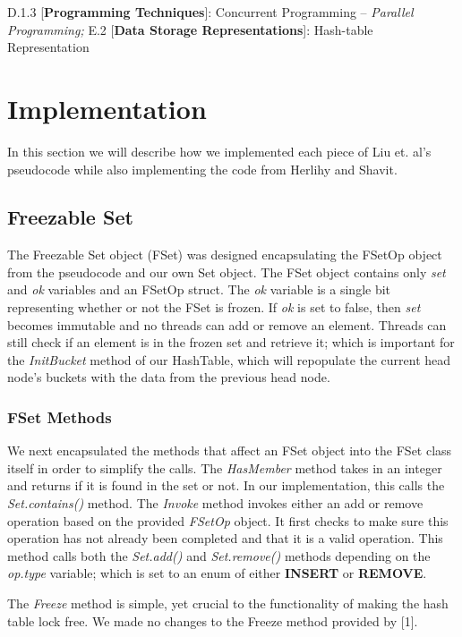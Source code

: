 \documentclass[11pt]{article} %
\begin{document}
D.1.3 [\textbf{Programming Techniques}]: Concurrent Programming -- \textit{Parallel Programming;} E.2 [\textbf{Data Storage Representations}]: Hash-table Representation

\section{Implementation}

In this section we will describe how we implemented each piece of Liu et. al's pseudocode while also implementing the code from Herlihy and Shavit.

\subsection{Freezable Set}

The Freezable Set object (FSet) was designed encapsulating the FSetOp object from the pseudocode and our own Set object. The FSet object contains only \textit{set} and \textit{ok} variables and an FSetOp struct. The \textit{ok} variable is a single bit representing whether or not the FSet is frozen. If \textit{ok} is set to false, then \textit{set} becomes immutable and no threads can add or remove an element. Threads can still check if an element is in the frozen set and retrieve it; which is important for the \textit{InitBucket} method of our HashTable, which will repopulate the current head node's buckets with the data from the previous head node.

\subsubsection{FSet Methods}

We next encapsulated the methods that affect an FSet object into the FSet class itself in order to simplify the calls. The \textit{HasMember} method takes in an integer and returns if it is found in the set or not. In our implementation, this calls the \textit{Set.contains()} method. The \textit{Invoke} method invokes either an add or remove operation based on the provided \textit{FSetOp} object. It first checks to make sure this operation has not already been completed and that it is a valid operation. This method calls both the \textit{Set.add()} and \textit{Set.remove()} methods depending on the \textit{op.type} variable; which is set to an enum of either \textbf{INSERT} or \textbf{REMOVE}. 

The \textit{Freeze} method is simple, yet crucial to the functionality of making the hash table lock free. We made no changes to the Freeze method provided by [1].
\end{document}
